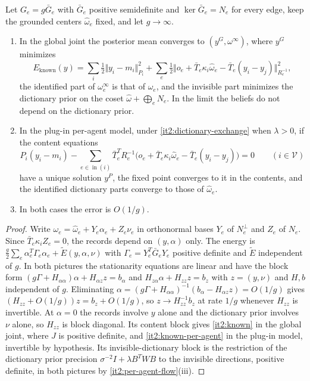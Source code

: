 Let $G_e=g\bar G_e$ with $\bar G_e$ positive semidefinite and $\ker\bar G_e=N_e$ for every edge, keep the grounded centers $\hat\omega_e$ fixed, and let $g\to\infty$.
\begin{enumerate}
\item[(i)] In the global joint the posterior mean converges to $(y^G,\omega^\infty)$, where $y^G$ minimizes
\begin{equation}
E_{\mathrm{known}}(y)=\sum_i\tfrac12\Vert y_i-m_i\Vert_{P_i}^2+\sum_e\tfrac12\bigl\Vert o_e+\bar T_e\kappa_i\hat\omega_e-\bar T_e(y_i-y_j)\bigr\Vert_{R_e^{-1}}^2,
\label{it2:known}
\end{equation}
the identified part of $\omega^\infty_e$ is that of $\hat\omega_e$, and the invisible part minimizes the dictionary prior on the coset $\hat\omega+\bigoplus_eN_e$. In the limit the beliefs do not depend on the dictionary prior.
\item[(ii)] In the plug-in per-agent model, under \cref{it2:dictionary-exchange} when $\lambda>0$, if the content equations
\begin{equation}
P_i(y_i-m_i)-\sum_{e\in\operatorname{in}(i)}\bar T_e^TR_e^{-1}\bigl(o_e+\bar T_e\kappa_i\hat\omega_e-\bar T_e(y_i-y_j)\bigr)=0\qquad(i\in\mathcal V)
\label{it2:known-per-agent}
\end{equation}
have a unique solution $y^P$, the fixed point converges to it in the contents, and the identified dictionary parts converge to those of $\hat\omega_e$.
\item[(iii)] In both cases the error is $O(1/g)$.
\end{enumerate}
\begin{proof}
Write $\omega_e=\hat\omega_e+Y_e\alpha_e+Z_e\nu_e$ in orthonormal bases $Y_e$ of $N_e^\perp$ and $Z_e$ of $N_e$. Since $\bar T_e\kappa_iZ_e=0$, the records depend on $(y,\alpha)$ only. The energy is $\frac g2\sum_e\alpha_e^T\Gamma_e\alpha_e+\tilde E(y,\alpha,\nu)$ with $\Gamma_e=Y_e^T\bar G_eY_e$ positive definite and $\tilde E$ independent of $g$. In both pictures the stationarity equations are linear and have the block form $(g\Gamma+H_{\alpha\alpha})\alpha+H_{\alpha z}z=b_\alpha$ and $H_{z\alpha}\alpha+H_{zz}z=b_z$ with $z=(y,\nu)$ and $H,b$ independent of $g$. Eliminating $\alpha=(g\Gamma+H_{\alpha\alpha})^{-1}(b_\alpha-H_{\alpha z}z)=O(1/g)$ gives $(H_{zz}+O(1/g))z=b_z+O(1/g)$, so $z\to H_{zz}^{-1}b_z$ at rate $1/g$ whenever $H_{zz}$ is invertible. At $\alpha=0$ the records involve $y$ alone and the dictionary prior involves $\nu$ alone, so $H_{zz}$ is block diagonal. Its content block gives \cref{it2:known} in the global joint, where $J$ is positive definite, and \cref{it2:known-per-agent} in the plug-in model, invertible by hypothesis. Its invisible-dictionary block is the restriction of the dictionary prior precision $\sigma^{-2}I+\lambda B^TWB$ to the invisible directions, positive definite, in both pictures by \cref{it2:per-agent-flow}(iii).
\end{proof}

